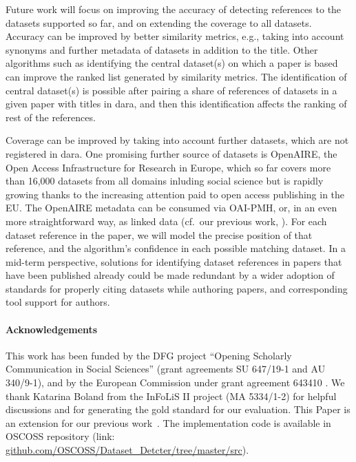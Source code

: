 \documentclass{IOS-Book-Article}
\newcommand{\dara}{\textsf{da\textbar ra}}
\begin{document}
Future work will focus on improving the accuracy of detecting references to the datasets supported so far, and on extending the coverage to all datasets.
Accuracy can be improved by better similarity metrics, e.g., taking into account synonyms and further metadata of datasets in addition to the title.
Other algorithms such as identifying the central dataset(s) on which a paper is based can improve the ranked list generated by similarity metrics.
The identification of central dataset(s) is possible after pairing a share of references of datasets in a given paper with titles in {\dara}, and then this identification affects the ranking of rest of the references. 

Coverage can be improved by 
taking into account further datasets, which are not registered in {\dara}.
One promising further source of datasets is OpenAIRE, the Open Access Infrastructure for Research in Europe, which so far covers more than 16,000 datasets from all domains inluding social science but is rapidly growing thanks to the increasing attention paid to open access publishing in the EU.
The OpenAIRE metadata can be consumed via OAI-PMH, or, in an even more straightforward way, as linked data (cf.\ our previous work, \citet{VahdatiEtAl:MappingResearchMetadata15}).
For each dataset reference in the paper, we will model the precise position of that reference, and the algorithm's confidence in each possible matching dataset.
In a mid-term perspective, solutions for identifying dataset references in papers that have been published already could be made redundant by a wider adoption of 
standards for properly citing datasets while authoring papers, and corresponding tool support for authors.

\paragraph{Acknowledgements}
This work has been funded by the DFG project “Opening Scholarly Communication in Social Sciences” 
(grant agreements SU 647/19-1 and AU 340/9-1), and by the European Commission under grant agreement 643410
. We thank Katarina Boland from the InFoLiS II project (MA 5334/1-2) for helpful discussions and for generating the gold standard for our evaluation. This Paper is an extension for our previous work~\cite{ghavimi2016identifying}. The implementation code is available in OSCOSS repository (link: \url{github.com/OSCOSS/Dataset_Detcter/tree/master/src}). 

\end{document}
